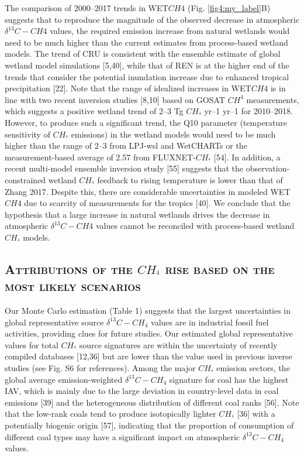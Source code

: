 \documentclass[a4paper,12pt]{article}
\begin{document}
\small{The comparison of 2000–2017 trends in WET${CH4}$ (Fig. \ref{fig4:my_label}B) suggests that to reproduce the magnitude of the observed decrease in atmospheric $\delta^{13}$$C-CH{4}$ values, the required emission increase from natural wetlands would need to be much higher than the current estimates from process-based wetland models. The trend of CRU is consistent with the ensemble estimate of global wetland model simulations [5,40], while that of REN is at the higher end of the trends that consider the potential inundation increase due to enhanced tropical precipitation [22]. Note that the range of idealized increases in WET${CH4}$ is in line with two recent inversion studies [8,10] based on GOSAT $CH^{4}$ measurements, which suggests a positive wetland trend of 2–3 Tg $CH_^{4}$ yr–1 yr–1 for 2010–2018. However, to produce such a significant trend, the Q10 parameter (temperature sensitivity of $CH_^{4}$ emissions) in the wetland models would need to be much higher than the range of 2–3 from LPJ-wsl and WetCHARTs or the measurement-based average of 2.57 from FLUXNET-$CH_^{4}$ [54]. In addition, a recent multi-model ensemble inversion study [55] suggests that the observation-constrained wetland $CH_^{4}$ feedback to rising temperature is lower than that of Zhang 2017. Despite this, there are considerable uncertainties in modeled WET${CH4}$ due to scarcity of measurements for the tropics [40]. We conclude that the hypothesis that a large increase in natural wetlands drives the decrease in atmospheric $\delta^{13}$$C-CH{4}$ values cannot be reconciled with process-based wetland $CH_^{4}$ models.}

\newpage
\subsection*{\textbf{\textsc{\large{Attributions of the $CH_^{4}$ rise based on the most likely scenarios}}}}

\small{Our Monte Carlo estimation (Table 1) suggests that the largest uncertainties in global representative source $\delta^{13}$$C-CH_{4}$ values are in industrial fossil fuel activities, providing clues for future studies. Our estimated global representative values for total $CH_^{4}$ source signatures are within the uncertainty of recently compiled databases [12,36] but are lower than the value used in previous inverse studies (see Fig. S6 for references). Among the major $CH_^{4}$ emission sectors, the global average emission-weighted $\delta^{13}$$C-CH_{4}$ signature for coal has the highest IAV, which is mainly due to the large deviation in country-level data in coal emissions [39] and the heterogeneous distribution of different coal ranks [56]. Note that the low-rank coals tend to produce isotopically lighter $CH_^{4}$ [36] with a potentially biogenic origin [57], indicating that the proportion of consumption of different coal types may have a significant impact on atmospheric $\delta^{13}$$C-CH_{4}$ values.}\\
\end{document}
